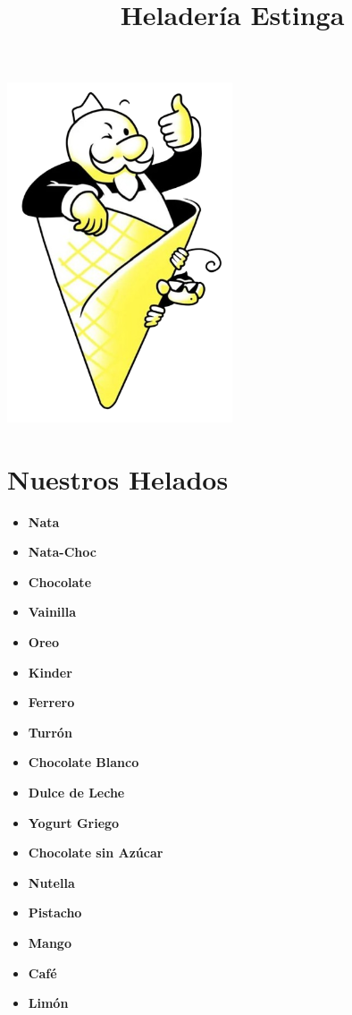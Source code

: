 \documentclass[a4paper,12pt]{article}
\title{\textbf{Heladería Estinga}}
\date{}
\begin{document}
\maketitle

\begin{center}
    \includegraphics[width=0.5\textwidth]{../../images/LogoNoBG.png}
\end{center}

\setmainfont{Arial}

\section*{Nuestros Helados}
\begin{multicols}{3}
\begin{itemize}
    \item \textbf{Nata}
    \item \textbf{Nata-Choc}
    \item \textbf{Chocolate}
    \item \textbf{Vainilla}
    \item \textbf{Oreo}
    \item \textbf{Kinder}
    \item \textbf{Ferrero}
    \item \textbf{Turrón}
    \item \textbf{Chocolate Blanco}
    \item \textbf{Dulce de Leche}
    \item \textbf{Yogurt Griego}
    \item \textbf{Chocolate sin Azúcar}
    \item \textbf{Nutella}
    \item \textbf{Pistacho}
    \item \textbf{Mango}
    \item \textbf{Café}
    \item \textbf{Limón}
\end{itemize}
\end{multicols}
\end{document}
